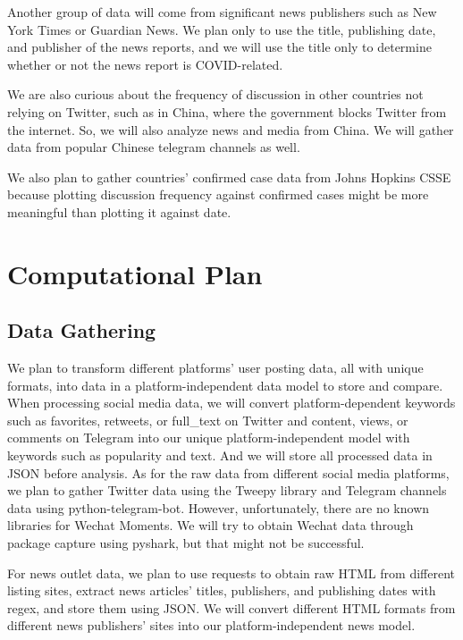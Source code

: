 \documentclass[fontsize=11pt]{article}
\begin{document}
    Another group of data will come from significant news publishers such as New York Times or Guardian News. We plan only to use the title, publishing date, and publisher of the news reports, and we will use the title only to determine whether or not the news report is COVID-related.

    We are also curious about the frequency of discussion in other countries not relying on Twitter, such as in China, where the government blocks Twitter from the internet. So, we will also analyze news and media from China. We will gather data from popular Chinese telegram channels as well.

    We also plan to gather countries’ confirmed case data from Johns Hopkins CSSE because plotting discussion frequency against confirmed cases might be more meaningful than plotting it against date.

    \section*{Computational Plan}

    \subsection*{Data Gathering}

    We plan to transform different platforms’ user posting data, all with unique formats, into data in a platform-independent data model to store and compare. When processing social media data, we will convert platform-dependent keywords such as favorites, retweets, or full\_text on Twitter and content, views, or comments on Telegram into our unique platform-independent model with keywords such as popularity and text. And we will store all processed data in JSON before analysis. As for the raw data from different social media platforms, we plan to gather Twitter data using the Tweepy library and Telegram channels data using python-telegram-bot. However, unfortunately, there are no known libraries for Wechat Moments. We will try to obtain Wechat data through package capture using pyshark, but that might not be successful.

    For news outlet data, we plan to use requests to obtain raw HTML from different listing sites, extract news articles’ titles, publishers, and publishing dates with regex, and store them using JSON. We will convert different HTML formats from different news publishers’ sites into our platform-independent news model.
\end{document}
